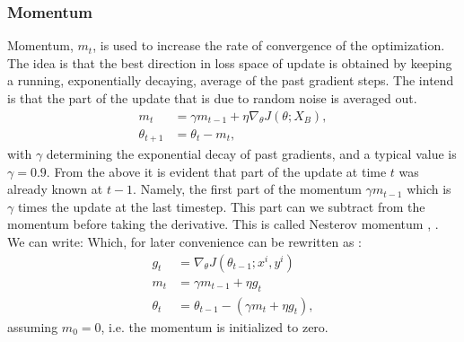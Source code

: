 \subsubsection{Momentum}
Momentum, $m_t$, \cite{qianMomentumTermGradient1999} is used to increase the rate of convergence of the optimization. 
The idea is that the best direction in loss space of update is obtained by keeping a running, exponentially decaying, average of the past gradient steps. 
The intend is that the part of the update that is due to random noise is averaged out.
\begin{align}
	m_t 	     &= \gamma m_{t-1}	+ \eta \nabla_\theta J(\theta; X_B),\\
	\theta_{t+1} &= \theta_{t} -  m_t ,
\end{align}
with $\gamma$ determining the exponential decay of past gradients, and a typical value is $\gamma= 0.9$.
From the above it is evident that part of the update at time $t$ was already known at $t-1$. 
Namely, the first part of the momentum $\gamma m_{t-1}$ which is $\gamma$ times the update at the last timestep. 
This part can we subtract from the momentum before taking the derivative.
This is called Nesterov momentum \cite{nesterovMethodSolvingConvex1983a}, \cite{sutskeverImportanceInitializationMomentuma}. 
We can write:
Which, for later convenience can be rewritten as \cite{dozatINCORPORATINGNESTEROVMOMENTUM2016}:
\begin{align}
g_t 		 &= \nabla_\theta J(\theta_{t-1}; x^{i}, y^{i}) \\
m_t 	     &= \gamma m_{t-1}	+ \eta g_t \\
\theta_{t} &= \theta_{t-1} - (\gamma m_t + \eta g_t ),
\end{align}
assuming $m_0 =0$, i.e. the momentum is initialized to zero.
